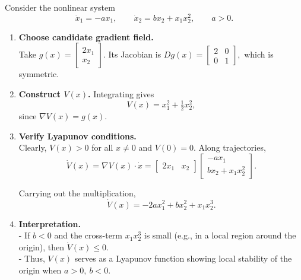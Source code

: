 \begin{example}
Consider the nonlinear system
\[
\dot{x}_1=-a x_1,\qquad \dot{x}_2= b x_2 + x_1x_2^2,\qquad a>0.
\]

\begin{enumerate}
\item \textbf{Choose candidate gradient field.}  
\\Take
$
g(x)=\begin{bmatrix}2x_1\\ x_2\end{bmatrix}.
$
Its Jacobian is
$
Dg(x)=\begin{bmatrix}2 & 0\\0 & 1\end{bmatrix},
$
which is symmetric.

\item \textbf{Construct \(V(x)\).}  
Integrating gives
\[
V(x)=x_1^2+\tfrac{1}{2}x_2^2,
\]
since \(\nabla V(x)=g(x)\).

\item \textbf{Verify Lyapunov conditions.}  
\\Clearly, \(V(x)>0\) for all \(x\neq 0\) and \(V(0)=0\). Along trajectories,
\[
\dot{V}(x)=\nabla V(x)\cdot \dot{x}
=\begin{bmatrix}2x_1 & x_2\end{bmatrix}
\begin{bmatrix}-a x_1\\ b x_2+x_1x_2^2\end{bmatrix}.
\]

Carrying out the multiplication,
\[
\dot{V}(x)=-2a x_1^2+b x_2^2+x_1x_2^3.
\]

\item \textbf{Interpretation.}  
\\- If \(b<0\) and the cross-term \(x_1x_2^3\) is small (e.g., in a local region around the origin), then \(\dot{V}(x)\leq 0\).  
\\- Thus, \(V(x)\) serves as a Lyapunov function showing local stability of the origin when \(a>0,\ b<0\).
\end{enumerate}
\end{example}


